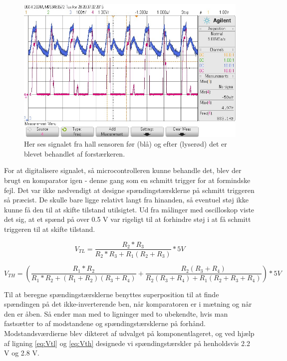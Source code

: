 \begin{figure}[h]

	\centering
		\includegraphics[scale=0.4]{Billeder/Signal1.jpg}
	\caption{Her ses signalet fra hall sensoren før (blå) og efter (lyserød) det er blevet behandlet af forstærkeren.}
	\label{fig:Signal1}
	
\end{figure}

For at digitalisere signalet, så microcontrolleren kunne behandle det, blev der brugt en komparator igen - denne gang som en schmitt trigger for at formindske fejl. Det var ikke nødvendigt at designe spændingstærsklerne på schmitt triggeren så præcist. De skulle bare ligge relativt langt fra hinanden, så eventuel støj ikke kunne få den til at skifte tilstand utilsigtet. Ud fra  målinger med oscilloskop viste det sig, at et spænd på over 0.5 V var rigeligt til at forhindre støj i at få schmitt triggeren til at skifte tilstand.

\begin{equation}
V_{TL} = \dfrac{R_{2}*R_{3}}{R_{2}*R_{3}+R_{1}(R_{2}+R_{3})}*5V
\label{eq:Vtl}
\end{equation}


\begin{equation}
V_{TH} = \left(\dfrac{R_{1}*R_{2}}{R_{1}*R_{2}+(R_{1}+R_{2})(R_{3}+R_{4})} + \dfrac{R_{2}(R_{3}+R_{4})}{R_{2}(R_{3}+R_{4})+R_{1}(R_{2}+R_{3}+R_{4})}\right)*5V
\label{eq:Vth}
\end{equation}



Til at beregne spændingstærsklerne benyttes superposition til at finde spændingen på det ikke-inverterende ben, når komparatoren er i mætning og når den er åben. Så ender man med to ligninger med to ubekendte, hvis man fastsætter to af modstandene og spændingstærsklerne på forhånd. Modstandsværdierne blev dikteret af udvalget på komponentlageret, og ved hjælp af ligning \eqref{eq:Vtl} og \eqref{eq:Vth} designede vi spændingstærskler på henholdsvis 2.2 V og 2.8 V. 

